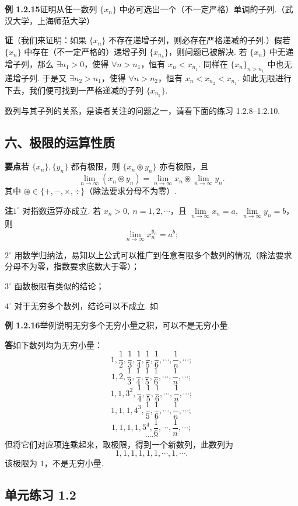 \documentclass[UTF8,12pt,a4paper,fontset=fandol]{ctexart}
\begin{document}
\noindent\textbf{例 1.2.15}\quad 证明从任一数列 $\{x_n\}$ 中必可选出一个（不一定严格）单调的子列.（武汉大学，上海师范大学）

\noindent\textbf{证}\quad （我们来证明：如果 $\{x_n\}$ 不存在递增子列，则必存在严格递减的子列.）假若 $\{x_n\}$ 中存在（不一定严格的）递增子列 $\{x_{n_k}\}$，则问题已被解决. 若 $\{x_n\}$ 中无递增子列，那么 $\exists n_1>0$，使得 $\forall n>n_1$，恒有 $x_n<x_{n_1}$. 同样在 $\{x_n\}_{n>n_1}$ 中也无递增子列. 于是又 $\exists n_2>n_1$，使得 $\forall n>n_2$，恒有 $x_n<x_{n_2}<x_{n_1}$. 如此无限进行下去，我们便可找到一严格递减的子列 $\{x_{n_k}\}$.

数列与其子列的关系，是读者关注的问题之一，请看下面的练习 1.2.8--1.2.10.

\subsection*{六、极限的运算性质}

\noindent\textbf{要点}\quad 若 $\{x_n\},\{y_n\}$ 都有极限，则 $\{x_n\circledast y_n\}$ 亦有极限，且
\[
  \lim_{n\to\infty}(x_n\circledast y_n)
  =\lim_{n\to\infty}x_n\circledast\lim_{n\to\infty}y_n.
\]
其中 $\circledast\in\{+,-,\times,\div\}$（除法要求分母不为零）.

\noindent\textbf{注}\quad $1^\circ$ 对指数运算亦成立. 若 $x_n>0,\ n=1,2,\cdots$，且 $\lim\limits_{n\to\infty}x_n=a,\ \lim\limits_{n\to\infty}y_n=b$，则
\[
  \lim_{n\to\infty}x_n^{y_n}=a^b;
\]

$2^\circ$ 用数学归纳法，易知以上公式可以推广到任意有限多个数列的情况（除法要求分母不为零，指数要求底数大于零）；

$3^\circ$ 函数极限有类似的结论；

$4^\circ$ 对于无穷多个数列，结论可以不成立. 如

\noindent\textbf{例 1.2.16}\quad 举例说明无穷多个无穷小量之积，可以不是无穷小量.

\noindent\textbf{答}\quad 如下数列均为无穷小量：
\[
1,\frac12,\frac13,\frac14,\frac15,\frac16,\cdots,\frac1n,\cdots;
\]
\[
1,2,\frac13,\frac14,\frac15,\frac16,\cdots,\frac1n,\cdots;
\]
\[
1,1,3^2,\frac14,\frac15,\frac16,\cdots,\frac1n,\cdots;
\]
\[
1,1,1,4^3,\frac15,\frac16,\cdots,\frac1n,\cdots;
\]
\[
1,1,1,1,5^4,\frac16,\cdots,\frac1n,\cdots;
\]
\[
\cdots\cdots
\]
但将它们对应项连乘起来，取极限，得到一个新数列，此数列为
\[
1,1,1,1,1,1,\cdots,1,\cdots.
\]
该极限为 $1$，不是无穷小量.

\subsection*{单元练习 1.2}
\end{document}
